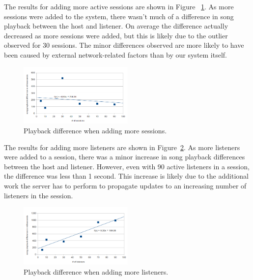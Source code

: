 The results for adding more active sessions are shown in Figure
~\ref{fig:addSessions}. As more sessions were added to the system,
there wasn't much of a difference in song playback between the host
and listener. On average the difference actually decreased as more
sessions were added, but this is likely due to the outlier observed
for 30 sessions. The minor differences
observed are more likely to
have been caused by external network-related factors than by our
system itself.

\begin{figure}[h]
	\centering
	\includegraphics[width=0.5\textwidth]{add_sessions.png}
	\caption{Playback difference when adding more sessions.}
	\label{fig:addSessions}
\end{figure}

The results for adding more listeners are shown in Figure~\ref{fig:addListeners}.
As more listeners were added to a
session, there was a minor increase in song playback differences
between the host and listener. However, even with 90 active listeners
in a session, the difference was less than 1 second. This increase is
likely due to the additional work the server has to perform to
propagate updates to an increasing number of listeners in the
session.

\begin{figure}[h]
	\centering
	\includegraphics[width=0.5\textwidth]{add_listeners.png}
	\caption{Playback difference when adding more listeners.}
	\label{fig:addListeners}
\end{figure}

